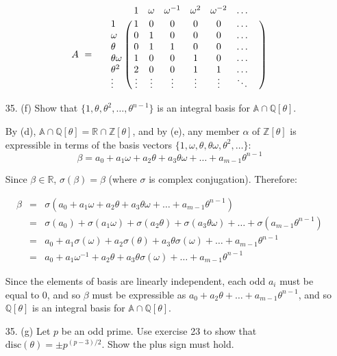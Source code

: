 \documentclass{article}
\newcommand{\w}[0]{\omega}
\newcommand{\Q}[0]{\mathbb{Q}}
\newcommand{\R}[0]{\mathbb{R}}
\newcommand{\Z}[0]{\mathbb{Z}}
\newcommand{\disc}[1]{\text{disc}(#1)}
\begin{document}
\begin{enumerate}
\[
    A\ =\hspace{5mm}
    \bordermatrix{
             & 1 & \w& \w^{-1} & \w^2 & \w^{-2} & \ldots \cr
    1        & 1 &  0  & 0 & 0 & 0 & \ldots \cr
    \w       &  0  & 1 & 0 & 0 & 0 & \ldots \cr
    \theta   &  0  & 1 & 1 & 0 & 0 & \ldots \cr
    \theta\w &  1  & 0 & 0 & 1 & 0 & \ldots \cr
    \theta^2 &  2  & 0 & 0 & 1 & 1 & \ldots \cr
    \vdots   & \vdots & \vdots & \vdots & \vdots & \vdots & \ddots & \cr
    }
\]

\item[35. (f)] Show that $\{ 1, \theta, \theta^2, \ldots, \theta^{n-1} \}$ is an integral basis for $\mathbb{A} \cap \Q[\theta]$.

By (d), $\mathbb{A} \cap \Q[\theta] = \R \cap \Z[\theta]$, and by (e), any member $\alpha$ of $\Z[\theta]$ is expressible in terms of the basis vectors $\{ 1, \w, \theta, \theta\w, \theta^2, \ldots \}$:
\[ \beta = a_0 + a_1 \w + a_2 \theta + a_3 \theta \w + \ldots + a_{m-1} \theta^{n-1} \]

Since $\beta \in \mathbb{R}$, $\sigma(\beta) = \beta$ (where $\sigma$ is complex conjugation).  Therefore:

\begin{eqnarray*}
\beta &=& \sigma(a_0 + a_1 \w + a_2 \theta + a_3 \theta\omega + \ldots + a_{m-1}\theta^{n-1})\\
    &=& \sigma(a_0) + \sigma(a_1 \w) + \sigma(a_2 \theta) + \sigma(a_3 \theta\omega) + \ldots + \sigma(a_{m-1}\theta^{n-1}) \\
    &=& a_0 + a_1 \sigma(\w) + a_2 \sigma(\theta) + a_3 \theta\sigma(\omega) + \ldots + a_{m-1}\theta^{n-1} \\
    &=& a_0 + a_1 \w^{-1}+ a_2 \theta + a_3 \theta\sigma(\omega) + \ldots + a_{m-1}\theta^{n-1}
\end{eqnarray*}

Since the elements of basis are linearly independent, each odd $a_{i}$ must be equal to 0, and so $\beta$ must be expressible as $a_0 + a_2\theta + \ldots + a_{m-1}\theta^{n-1}$, and so $\Q[\theta]$ is an integral basis for $\mathbb{A} \cap \Q[\theta]$.

\item[35. (g)] Let $p$ be an odd prime.  Use exercise 23 to show that $\disc{\theta} = \pm p^{(p-3)/2}$.  Show the plus sign must hold.


\end{enumerate}
\end{document}
